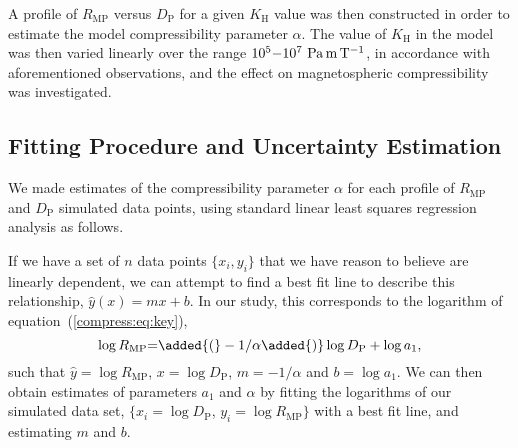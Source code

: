 A profile of $R_\mathrm{MP}$ versus $D_\mathrm{P}$ for a given $K_\mathrm{H}$ value was then constructed in order to estimate the model compressibility parameter $\alpha$. The value of $K_\mathrm{H}$ in the model was then varied linearly over the range $10^5{\--}10^7~\si{\pascal\meter\per\tesla}$, in accordance with aforementioned observations, and the effect on magnetospheric compressibility was investigated. 

\subsection{Fitting Procedure and Uncertainty Estimation}
We made estimates of the compressibility parameter $\alpha$ for each profile of $R_\mathrm{MP}$ and $D_\mathrm{P}$ simulated data points, using standard linear least squares regression analysis as follows. 

If we have a set of $n$ data points $\{x_i,y_i\}$ that we have reason to believe are linearly dependent, we can attempt to find a best fit line to describe this relationship, $\hat{y}(x) = mx + b$. In our study, this corresponds to the logarithm of equation~(\ref{compress:eq:key}),
\begin{equation}
\log{R_\mathrm{MP}}{=}\added{(}-1/{\alpha}\added{)}\log {D_\mathrm{P}}+\log{a_1},
\end{equation}
such that $\hat{y} = \log{R_\mathrm{MP}}$, $x =\log{D_\mathrm{P}}$, $ m = -1/\alpha$ and $b = \log{a_1}$. We can then obtain estimates of parameters $a_1$ and $\alpha$ by fitting the logarithms of our simulated data set, $\{x_i=\log{D_\mathrm{P}}$, $y_i=\log{R_\mathrm{MP}}\}$ with a best fit line, and estimating $m$ and $b$.

